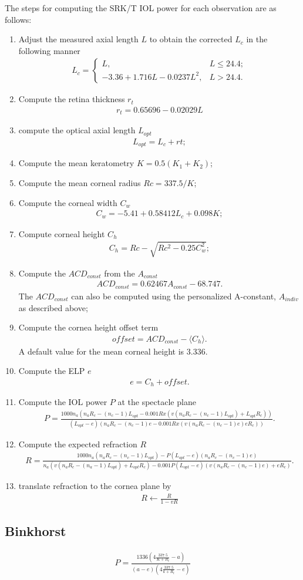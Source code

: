 \documentclass[article,twocolumn,preprint,10pt]{paper}%
\renewcommand{\(}{\left(}
\renewcommand{\)}{\right)}
\renewcommand{\[}{\left[}
\renewcommand{\]}{\right]}
\newcommand{\beq}{\begin{eqnarray}}
\newcommand{\eeq}{\end{eqnarray}}
\newcommand{\1}{\mbox{\boldmath$1$}}
\begin{document}
The steps for computing the SRK/T IOL power for each observation are as follows: 
\begin{enumerate} 
\item Adjust the measured axial length $L$ to obtain the corrected $L_c$ in the following manner 
\beq 
L_c = \begin{cases}
	L, & L\leq 24.4;\\
	-3.36+1.716L-0.0237L^2, & L>24.4.
\end{cases}
\eeq 
\item Compute the retina thickness $r_t$ 
\beq 
 r_t = 0.65696-0.02029L
\eeq 
\item compute the optical axial length $L_{opt}$
\beq 
 L_{opt} = L_c+rt;
\eeq 
\item Compute the mean keratometry $K = 0.5(K_1+K_2)$;
\item Compute the mean corneal radius $Rc = 337.5/K$;
\item Compute the corneal width $C_w$ 
\beq 
C_w = -5.41+0.58412L_c+0.098K;
\eeq 
\item Compute corneal height $C_h$
\beq 
 C_h = Rc-\sqrt{Rc^2- 0.25C_w^2};
\eeq 
\item Compute the $ACD_{const}$ from the $A_{const}$
\beq 
 ACD_{const} = 0.62467A_{const}-68.747.
\eeq 
The $ACD_{const}$ can also be computed using the personalized A-constant, $A_{indiv}$ as described above; 
\item Compute the cornea height offset term 
\beq 
offset = ACD_{const}-\langle C_h\rangle. 
\eeq 
A default value for the mean corneal height is 3.336.
\item Compute the ELP $e$
\beq 
e = C_h+offset.
\eeq 
\item Compute the IOL power $P$ at the spectacle plane 
\beq 
 P = \frac{1000n_a(n_aR_c-(n_c-1)L_{opt}-0.001Rx(v(n_aR_c-(n_c-1)L_{opt})+L_{opt}R_c))}{(L_{opt}-e)(n_aR_c-(n_c-1)e-0.001Rx(v(n_aR_c-(n_c-1)e)eR_c))}.
\eeq 
\item Compute the expected refraction $R$
\beq 
R = \frac{1000n_a(n_aR_c-(n_c-1)L_{opt})-P(L_{opt}-e)(n_aR_c-(n_c-1)e)}{n_a(v(n_aR_c-(n_a-1)L_{opt})+L_{opt}R_c)-0.001P(L_{opt}-e)(v(n_aR_c-(n_c-1)e)+eR_c) }.
\eeq 
\item translate refraction to the cornea plane by
\beq 
R \leftarrow \frac{R}{1-vR}
\eeq  

\end{enumerate}


\subsection{Binkhorst}\label{subsection:Binkhorst}
\beq 
P = \frac{1336(4\frac{337.5}{K+R_t}-a)}{(a-e)\left(4\frac{337.5}{k+R_t}-e\right)}
\eeq 
\end{document}
